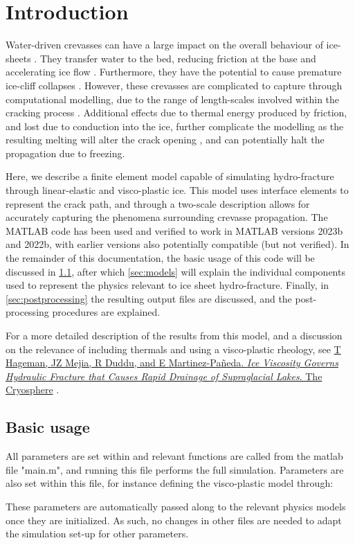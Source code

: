 \documentclass[3p]{elsarticle} %
\newcommand{\citeMe}{\href{https://doi.org/10.5194/tc-18-3991-2024}{T Hageman, JZ Mejia, R Duddu, and E {Martinez-Pa{\~n}eda}. \textit{Ice Viscosity Governs Hydraulic Fracture that Causes Rapid Drainage of Supraglacial Lakes}. The Cryosphere} \citep{Hageman}}
\begin{document}
\newpage
\tableofcontents

\newpage
{}
\section{Introduction}
Water-driven crevasses can have a large impact on the overall behaviour of ice-sheets \citep{Boon2003,Phillips2010a,Poinar2021,Krawczynski2009}. They transfer water to the bed, reducing friction at the base and accelerating ice flow \citep{Fountain2005,Smith2015,Dow2015}. Furthermore, they have the potential to cause premature ice-cliff collapses \citep{Scambos2009,McGrath2012,Buck2023}. However, these crevasses are complicated to capture through computational modelling, due to the range of length-scales involved within the cracking process \citep{Rice2015}. Additional effects due to thermal energy produced by friction, and lost due to conduction into the ice, further complicate the modelling as the resulting melting will alter the crack opening \citep{Andrews2022}, and can potentially halt the propagation due to freezing. 

Here, we describe a finite element model capable of simulating hydro-fracture through linear-elastic and visco-plastic ice. This model uses interface elements to represent the crack path, and through a two-scale description allows for accurately capturing the phenomena surrounding crevasse propagation. The MATLAB code has been used and verified to work in MATLAB versions 2023b and 2022b, with earlier versions also potentially compatible (but not verified). In the remainder of this documentation, the basic usage of this code will be discussed in \cref{sec:usage}, after which \cref{sec:models} will explain the individual components used to represent the physics relevant to ice sheet hydro-fracture. Finally, in \cref{sec:postprocessing} the resulting output files are discussed, and the post-processing procedures are explained. 

For a more detailed description of the results from this model, and a discussion on the relevance of including thermals and using a visco-plastic rheology, see \citeMe{}.

\subsection{Basic usage}
\label{sec:usage}
All parameters are set within and relevant functions are called from the matlab file "main.m", and running this file performs the full simulation. Parameters are also set within this file, for instance defining the visco-plastic model through:

These parameters are automatically passed along to the relevant physics models once they are initialized. As such, no changes in other files are needed to adapt the simulation set-up for other parameters. 
\end{document}
